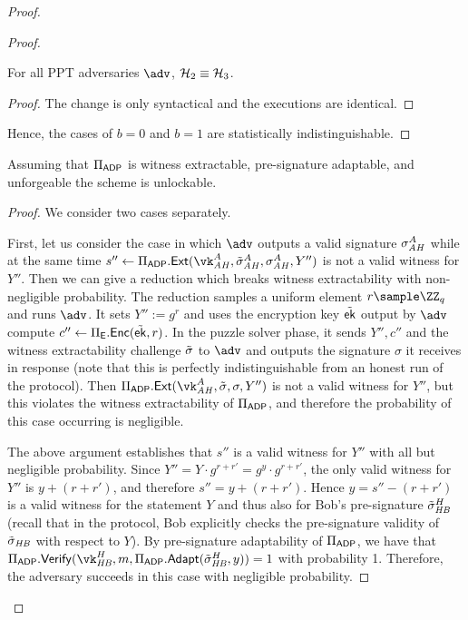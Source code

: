 \begin{proof}
\begin{proof}
        \begin{claim}
        For all PPT adversaries $\adv$, $\mathcal{H}_2 \equiv \mathcal{H}_3$.
        \end{claim}
        \begin{proof}
        The change is only syntactical and the executions are identical.
        \end{proof}
        
        Hence, the cases of $b=0$ and $b=1$ are statistically indistinguishable.
        \end{proof}
        
        
        \begin{lemma}[Unlockability]\label{lem:unlock}
        Assuming that $\Pi_{\mathsf{ADP}}$ is witness extractable, pre-signature adaptable, and unforgeable the \aalplus scheme is unlockable.
        \end{lemma}
        
        \begin{proof}
        We consider two cases separately.
        
        \smallskip{}
        First, let us consider the case in which $\adv$ outputs a valid signature $\sigma_{\mathit{AH}}^A$ while at the same time $s'' \gets \Pi_\ADP.\ext(\vk_\ah^A,\presig_\ah^A,\sigma_\ah^A,Y'')$ is not a valid witness for $Y''$. Then we can give a reduction which breaks witness extractability with non-negligible probability. The reduction samples a uniform element $r \sample \ZZ_q$ and runs $\adv$. It sets $Y'' := g^r$ and uses the encryption key $\tilde{\mathsf{ek}}$ output by $\adv$ compute $c'' \gets \Pi_{\mathsf{E}}.{\mathsf{Enc}}(\tilde{\mathsf{ek}},r)$. In the puzzle solver phase, it sends $Y'',c''$ and the witness extractability challenge $\tilde{\sigma}$ to $\adv$ and outputs the signature $\sigma$ it receives in response (note that this is {perfectly} indistinguishable from an honest run of the protocol). Then $\Pi_\ADP.\ext(\vk_\ah^A, \presig,\sigma,Y'')$ is not a valid witness for $Y''$, but this violates the witness extractability of $\Pi_{\mathsf{ADP}}$, and therefore the probability of this case occurring is negligible.
        
        The above argument establishes that $s''$ is a valid witness for $Y''$ with all but negligible probability. Since $Y'' = Y \cdot g^{r+r'} = g^y \cdot g^{r+r'}$, the only valid witness for $Y''$ is $y+(r+r')$, and therefore $s'' = y+(r+r')$. Hence $y=s''-(r+r')$ is a valid witness for the statement $Y$ and thus also for Bob's pre-signature $\tilde{\sigma}_{\mathit{HB}}^H$ (recall that in the protocol, Bob explicitly checks the pre-signature validity of $\tilde{\sigma}_{\mathit{HB}}$ with respect to $Y$). By pre-signature adaptability of $\Pi_{\mathsf{ADP}}$, we have that $\Pi_\ADP.\vrfy(\vk_\hb^H,m,\Pi_\ADP.\adapt(\presig_\hb^H,y))=1$ with probability 1. Therefore, the adversary succeeds in this case with negligible probability.
        

\end{proof}
\end{proof}
